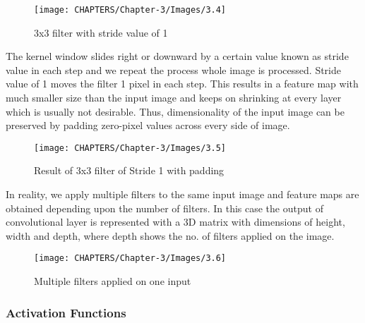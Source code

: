 \begin{figure}[H]
	\centering
		\texttt{[image: CHAPTERS/Chapter-3/Images/3.4]}
	\caption{3x3 filter with stride value of 1}
	\label{fig:3.4}
\end{figure}

The kernel window slides right or downward by a 
certain value known as stride value in each step and we repeat the process
whole image is processed. Stride value of
1 moves the filter 1 pixel in each step. This results in a feature map with 
much smaller size than the input image and keeps on shrinking at every layer 
which is usually not desirable. Thus, dimensionality of the input image can be 
preserved by padding zero-pixel values across every side of image.

\begin{figure}[H]
	\centering
		\texttt{[image: CHAPTERS/Chapter-3/Images/3.5]}
	\caption{Result  of 3x3 filter of Stride 1 with padding}
	\label{fig:3.5}
\end{figure}

In reality, we apply multiple filters to the same 
input image and feature maps are obtained depending upon the 
number of filters. In this case the output of convolutional layer 
is represented with a 3D matrix with dimensions of height, width 
and depth, where depth 
shows the no. of filters applied on the image. 

\begin{figure}[H]
	\centering
		\texttt{[image: CHAPTERS/Chapter-3/Images/3.6]}
	\caption{Multiple filters applied on one input}
	\label{fig:3.6}
\end{figure}

\subsubsection{Activation Functions}

